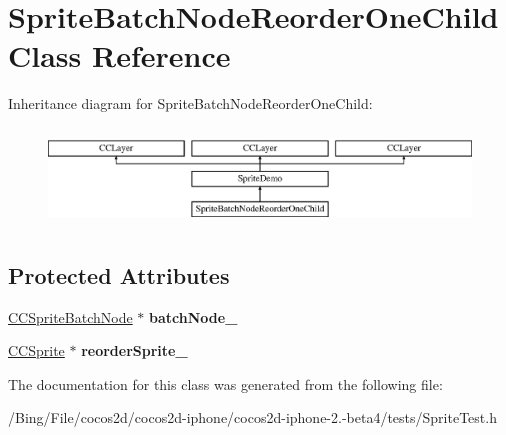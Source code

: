 \hypertarget{interface_sprite_batch_node_reorder_one_child}{\section{Sprite\-Batch\-Node\-Reorder\-One\-Child Class Reference}
\label{interface_sprite_batch_node_reorder_one_child}
}
Inheritance diagram for Sprite\-Batch\-Node\-Reorder\-One\-Child\-:\begin{figure}[H]
\begin{center}
\leavevmode
\includegraphics[height=2.616822cm]{interface_sprite_batch_node_reorder_one_child}
\end{center}
\end{figure}
\subsection*{Protected Attributes}
\begin{DoxyCompactItemize}
\item 
\hypertarget{interface_sprite_batch_node_reorder_one_child_a5e8cc7713b10de9469464dfb3a5b4774}{\hyperlink{interface_c_c_sprite_batch_node}{C\-C\-Sprite\-Batch\-Node} $\ast$ {\bfseries batch\-Node\-\_\-}}\label{interface_sprite_batch_node_reorder_one_child_a5e8cc7713b10de9469464dfb3a5b4774}

\item 
\hypertarget{interface_sprite_batch_node_reorder_one_child_abff8351d9fbd6f8cbfd9ff3fe38b03df}{\hyperlink{class_c_c_sprite}{C\-C\-Sprite} $\ast$ {\bfseries reorder\-Sprite\-\_\-}}\label{interface_sprite_batch_node_reorder_one_child_abff8351d9fbd6f8cbfd9ff3fe38b03df}

\end{DoxyCompactItemize}


The documentation for this class was generated from the following file\-:\begin{DoxyCompactItemize}
\item 
/\-Bing/\-File/cocos2d/cocos2d-\/iphone/cocos2d-\/iphone-\/2.-\/beta4/tests/Sprite\-Test.\-h\end{DoxyCompactItemize}
